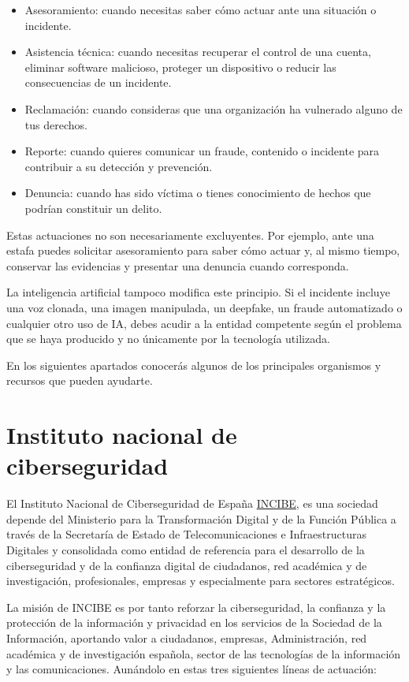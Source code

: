 \documentclass[
  spanish,
  a4paper,
  openany]{book}
\begin{document}
\begin{itemize}
\item
  Asesoramiento: cuando necesitas saber cómo actuar ante una situación o incidente.
\item
  Asistencia técnica: cuando necesitas recuperar el control de una cuenta, eliminar software malicioso, proteger un dispositivo o reducir las consecuencias de un incidente.
\item
  Reclamación: cuando consideras que una organización ha vulnerado alguno de tus derechos.
\item
  Reporte: cuando quieres comunicar un fraude, contenido o incidente para contribuir a su detección y prevención.
\item
  Denuncia: cuando has sido víctima o tienes conocimiento de hechos que podrían constituir un delito.
\end{itemize}

Estas actuaciones no son necesariamente excluyentes. Por ejemplo, ante una estafa puedes solicitar asesoramiento para saber cómo actuar y, al mismo tiempo, conservar las evidencias y presentar una denuncia cuando corresponda.

La inteligencia artificial tampoco modifica este principio. Si el incidente incluye una voz clonada, una imagen manipulada, un deepfake, un fraude automatizado o cualquier otro uso de IA, debes acudir a la entidad competente según el problema que se haya producido y no únicamente por la tecnología utilizada.

En los siguientes apartados conocerás algunos de los principales organismos y recursos que pueden ayudarte.

\section{Instituto nacional de ciberseguridad}\label{instituto-nacional-de-ciberseguridad}

El Instituto Nacional de Ciberseguridad de España \href{https://www.incibe.es/}{INCIBE}, es una sociedad depende del Ministerio para la Transformación Digital y de la Función Pública a través de la Secretaría de Estado de Telecomunicaciones e Infraestructuras Digitales y consolidada como entidad de referencia para el desarrollo de la ciberseguridad y de la confianza digital de ciudadanos, red académica y de investigación, profesionales, empresas y especialmente para sectores estratégicos.

La misión de INCIBE es por tanto reforzar la ciberseguridad, la confianza y la protección de la información y privacidad en los servicios de la Sociedad de la Información, aportando valor a ciudadanos, empresas, Administración, red académica y de investigación española, sector de las tecnologías de la información y las comunicaciones. Aunándolo en estas tres siguientes líneas de actuación:
\end{document}
